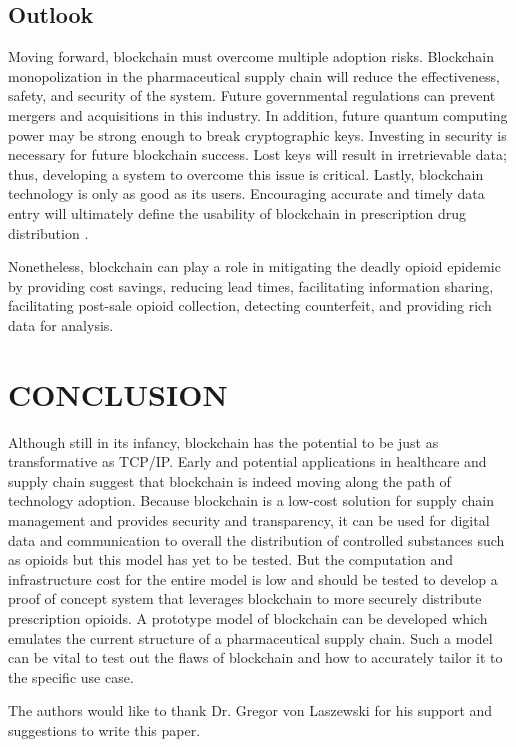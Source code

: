 \documentclass[sigconf]{acmart}
\begin{document}
\subsection{Outlook}
Moving forward, blockchain must overcome multiple adoption risks. Blockchain monopolization in the pharmaceutical supply chain will reduce the effectiveness, safety, and security of the system. Future governmental regulations can prevent mergers and acquisitions in this industry. In addition, future quantum computing power may be strong enough to break cryptographic keys. Investing in security is necessary for future blockchain success. Lost keys will result in irretrievable data; thus, developing a system to overcome this issue is critical. Lastly, blockchain technology is only as good as its users. Encouraging accurate and timely data entry will ultimately define the usability of blockchain in prescription drug distribution \cite{hitchingHealthcare}.

Nonetheless, blockchain can play a role in mitigating the deadly opioid epidemic by providing cost savings, reducing lead times, facilitating information sharing, facilitating post-sale opioid collection, detecting counterfeit, and providing rich data for analysis.

\section{CONCLUSION}
Although still in its infancy, blockchain has the potential to be just as transformative as TCP/IP. Early and potential applications in healthcare and supply chain suggest that blockchain is indeed moving along the path of technology adoption. Because blockchain is a low-cost solution for supply chain management and provides security and transparency, it can be used for digital data and communication to overall the distribution of controlled substances such as opioids but this model has yet to be tested. But the computation and infrastructure cost for the entire model is low and should be tested to develop a proof of concept system that leverages blockchain to more securely distribute prescription opioids. A prototype model of blockchain can be developed which emulates the current structure of a pharmaceutical supply chain. Such a model can be vital to test out the flaws of blockchain and how to accurately tailor it to the specific use case.  

\begin{acks}
The authors would like to thank Dr. Gregor von Laszewski for his support and suggestions to write this paper.
\end{acks}


 

\appendix


\end{document}
